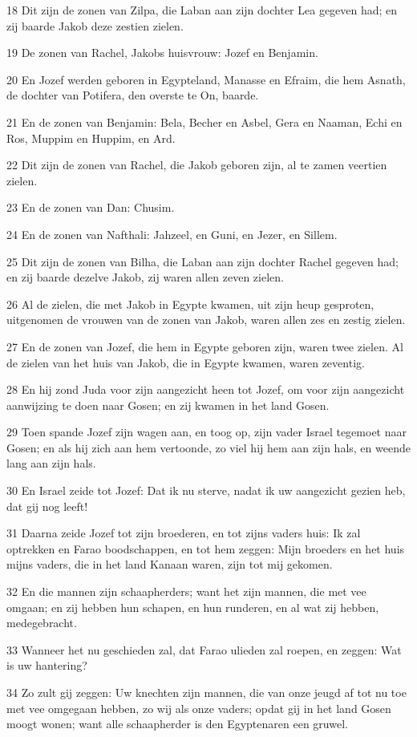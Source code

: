 \par 18 Dit zijn de zonen van Zilpa, die Laban aan zijn dochter Lea gegeven had; en zij baarde Jakob deze zestien zielen.
\par 19 De zonen van Rachel, Jakobs huisvrouw: Jozef en Benjamin.
\par 20 En Jozef werden geboren in Egypteland, Manasse en Efraim, die hem Asnath, de dochter van Potifera, den overste te On, baarde.
\par 21 En de zonen van Benjamin: Bela, Becher en Asbel, Gera en Naaman, Echi en Ros, Muppim en Huppim, en Ard.
\par 22 Dit zijn de zonen van Rachel, die Jakob geboren zijn, al te zamen veertien zielen.
\par 23 En de zonen van Dan: Chusim.
\par 24 En de zonen van Nafthali: Jahzeel, en Guni, en Jezer, en Sillem.
\par 25 Dit zijn de zonen van Bilha, die Laban aan zijn dochter Rachel gegeven had; en zij baarde dezelve Jakob, zij waren allen zeven zielen.
\par 26 Al de zielen, die met Jakob in Egypte kwamen, uit zijn heup gesproten, uitgenomen de vrouwen van de zonen van Jakob, waren allen zes en zestig zielen.
\par 27 En de zonen van Jozef, die hem in Egypte geboren zijn, waren twee zielen. Al de zielen van het huis van Jakob, die in Egypte kwamen, waren zeventig.
\par 28 En hij zond Juda voor zijn aangezicht heen tot Jozef, om voor zijn aangezicht aanwijzing te doen naar Gosen; en zij kwamen in het land Gosen.
\par 29 Toen spande Jozef zijn wagen aan, en toog op, zijn vader Israel tegemoet naar Gosen; en als hij zich aan hem vertoonde, zo viel hij hem aan zijn hals, en weende lang aan zijn hals.
\par 30 En Israel zeide tot Jozef: Dat ik nu sterve, nadat ik uw aangezicht gezien heb, dat gij nog leeft!
\par 31 Daarna zeide Jozef tot zijn broederen, en tot zijns vaders huis: Ik zal optrekken en Farao boodschappen, en tot hem zeggen: Mijn broeders en het huis mijns vaders, die in het land Kanaan waren, zijn tot mij gekomen.
\par 32 En die mannen zijn schaapherders; want het zijn mannen, die met vee omgaan; en zij hebben hun schapen, en hun runderen, en al wat zij hebben, medegebracht.
\par 33 Wanneer het nu geschieden zal, dat Farao ulieden zal roepen, en zeggen: Wat is uw hantering?
\par 34 Zo zult gij zeggen: Uw knechten zijn mannen, die van onze jeugd af tot nu toe met vee omgegaan hebben, zo wij als onze vaders; opdat gij in het land Gosen moogt wonen; want alle schaapherder is den Egyptenaren een gruwel.


